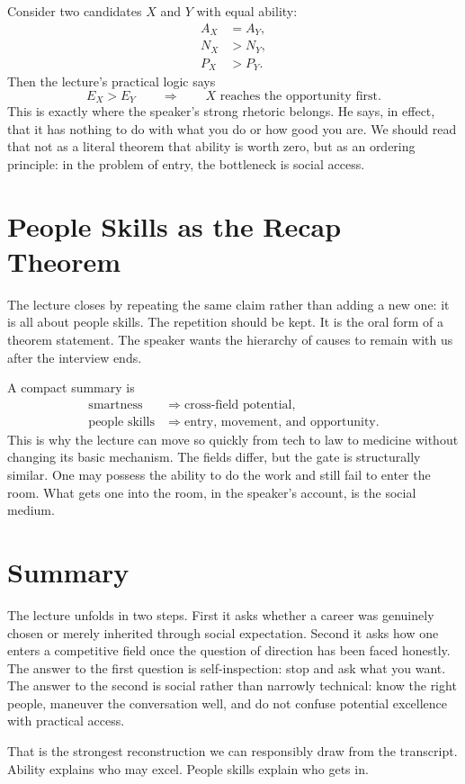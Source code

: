 Consider two candidates \(X\) and \(Y\) with equal ability:
\begin{align}
A_X &= A_Y,\\
N_X &> N_Y,\\
P_X &> P_Y.
\end{align}
Then the lecture's practical logic says
\begin{equation}
E_X > E_Y \qquad \Longrightarrow \qquad X \text{ reaches the opportunity first.}
\end{equation}
This is exactly where the speaker's strong rhetoric belongs. He says, in effect, that it has nothing to do with what you do or how good you are. We should read that not as a literal theorem that ability is worth zero, but as an ordering principle: in the problem of entry, the bottleneck is social access.

\section{People Skills as the Recap Theorem}

The lecture closes by repeating the same claim rather than adding a new one: it is all about people skills. The repetition should be kept. It is the oral form of a theorem statement. The speaker wants the hierarchy of causes to remain with us after the interview ends.

A compact summary is
\begin{align}
\text{smartness} &\Longrightarrow \text{cross-field potential},\\
\text{people skills} &\Longrightarrow \text{entry, movement, and opportunity}.
\end{align}
This is why the lecture can move so quickly from tech to law to medicine without changing its basic mechanism. The fields differ, but the gate is structurally similar. One may possess the ability to do the work and still fail to enter the room. What gets one into the room, in the speaker's account, is the social medium.

\section{Summary}

The lecture unfolds in two steps. First it asks whether a career was genuinely chosen or merely inherited through social expectation. Second it asks how one enters a competitive field once the question of direction has been faced honestly. The answer to the first question is self-inspection: stop and ask what you want. The answer to the second is social rather than narrowly technical: know the right people, maneuver the conversation well, and do not confuse potential excellence with practical access.

That is the strongest reconstruction we can responsibly draw from the transcript. Ability explains who may excel. People skills explain who gets in.
